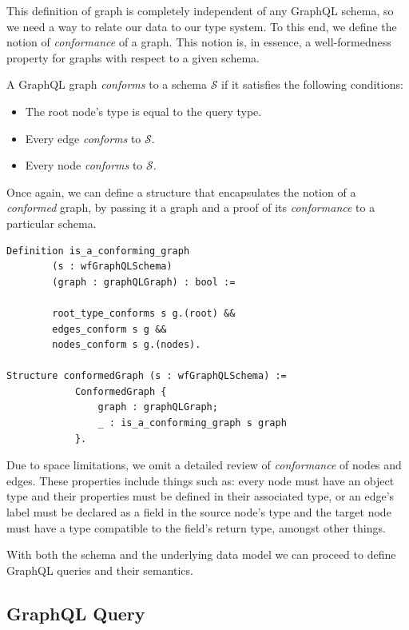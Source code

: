 This definition of graph is completely independent of any GraphQL schema, so we need a way to relate our data to our type system. To this end, we define the notion of \textit{conformance} of a graph. This notion is, in essence, a well-formedness property for graphs with respect to a given schema.

\begin{definition}
A GraphQL graph \textit{conforms} to a schema $\mathcal{S}$ if it satisfies the following conditions:
\begin{itemize}
    \item The root node's type is equal to the query type.
    \item Every edge \textit{conforms} to $\mathcal{S}$.
    \item Every node \textit{conforms} to $\mathcal{S}$.
\end{itemize}
\end{definition}

Once again, we can define a structure that encapsulates the notion of a \textit{conformed} graph, by passing it a graph and a proof of its \textit{conformance} to a particular schema. 

\begin{verbatim}
Definition is_a_conforming_graph 
        (s : wfGraphQLSchema)
        (graph : graphQLGraph) : bool :=
        
        root_type_conforms s g.(root) &&
        edges_conform s g &&
        nodes_conform s g.(nodes).
        
Structure conformedGraph (s : wfGraphQLSchema) :=
            ConformedGraph {
                graph : graphQLGraph;
                _ : is_a_conforming_graph s graph
            }.
\end{verbatim}

Due to space limitations, we omit a detailed review of \textit{conformance} of nodes and edges. These properties include things such as: every node must have an object type and their properties must be defined in their associated type, or an edge's label must be declared as a field in the source node's type and the target node must have a type compatible to the field's return type, amongst other things.

With both the schema and the underlying data model we can proceed to define GraphQL queries and their semantics.

\subsection{GraphQL Query}

